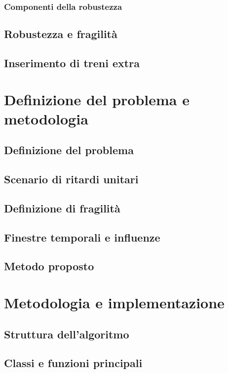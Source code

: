 \documentclass[a4paper,12pt]{report}
\begin{document}
\subsection{Componenti della robustezza}

\section{Robustezza e fragilità}
\section{Inserimento di treni extra}

\chapter{Definizione del problema e metodologia}
\section{Definizione del problema}
\section{Scenario di ritardi unitari}
\section{Definizione di fragilità}
\section{Finestre temporali e influenze}
\section{Metodo proposto}

\chapter{Metodologia e implementazione}
\section{Struttura dell’algoritmo}
\section{Classi e funzioni principali}
\end{document}
